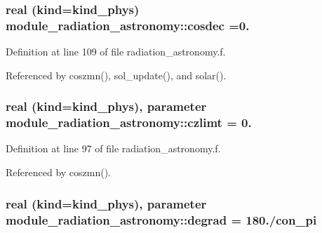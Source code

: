 \subsubsection[{\texorpdfstring{cosdec}{cosdec}}]{\setlength{\rightskip}{0pt plus 5cm}real (kind=kind\+\_\+phys) module\+\_\+radiation\+\_\+astronomy\+::cosdec =0.\hspace{0.3cm}{\ttfamily [private]}}\hypertarget{namespacemodule__radiation__astronomy_a07386e90045639b8023abd826e0e2768}{}\label{namespacemodule__radiation__astronomy_a07386e90045639b8023abd826e0e2768}


Definition at line 109 of file radiation\+\_\+astronomy.\+f.



Referenced by coszmn(), sol\+\_\+update(), and solar().

\subsubsection[{\texorpdfstring{czlimt}{czlimt}}]{\setlength{\rightskip}{0pt plus 5cm}real (kind=kind\+\_\+phys), parameter module\+\_\+radiation\+\_\+astronomy\+::czlimt = 0.\hspace{0.3cm}{\ttfamily [private]}}\hypertarget{namespacemodule__radiation__astronomy_afeb2fccbe8137de6099a09035762ff5e}{}\label{namespacemodule__radiation__astronomy_afeb2fccbe8137de6099a09035762ff5e}


Definition at line 97 of file radiation\+\_\+astronomy.\+f.



Referenced by coszmn().

\subsubsection[{\texorpdfstring{degrad}{degrad}}]{\setlength{\rightskip}{0pt plus 5cm}real (kind=kind\+\_\+phys), parameter module\+\_\+radiation\+\_\+astronomy\+::degrad = 180./con\+\_\+pi\hspace{0.3cm}{\ttfamily [private]}}\hypertarget{namespacemodule__radiation__astronomy_a220d2b997b3073cf2985d62111c5405d}{}\label{namespacemodule__radiation__astronomy_a220d2b997b3073cf2985d62111c5405d}


